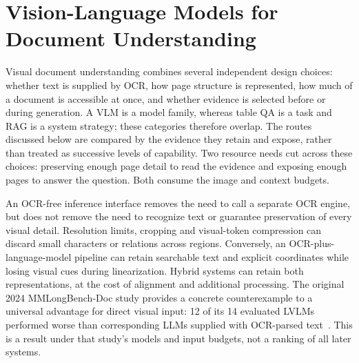 \section{Vision-Language Models for Document Understanding}
\label{sec:vlm}

Visual document understanding combines several independent design choices: whether text is supplied by OCR, how page structure is represented, how much of a document is accessible at once, and whether evidence is selected before or during generation. A VLM is a model family, whereas table QA is a task and RAG is a system strategy; these categories therefore overlap. The routes discussed below are compared by the evidence they retain and expose, rather than treated as successive levels of capability. Two resource needs cut across these choices: preserving enough page detail to read the evidence and exposing enough pages to answer the question. Both consume the image and context budgets.

An OCR-free inference interface removes the need to call a separate OCR engine, but does not remove the need to recognize text or guarantee preservation of every visual detail. Resolution limits, cropping and visual-token compression can discard small characters or relations across regions. Conversely, an OCR-plus-language-model pipeline can retain searchable text and explicit coordinates while losing visual cues during linearization. Hybrid systems can retain both representations, at the cost of alignment and additional processing. The original 2024 MMLongBench-Doc study provides a concrete counterexample to a universal advantage for direct visual input: 12 of its 14 evaluated LVLMs performed worse than corresponding LLMs supplied with OCR-parsed text~\cite{mmlongbenchdoc2024}. This is a result under that study's models and input budgets, not a ranking of all later systems.

